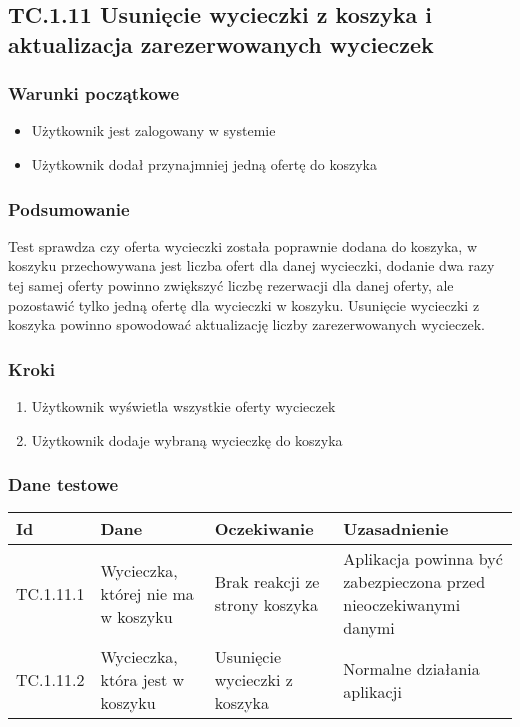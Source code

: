 \documentclass[a4paper,15pt]{article}
\begin{document}
\newpage
\begin{framed}
\subsection{TC.1.11 Usunięcie wycieczki z koszyka i aktualizacja zarezerwowanych wycieczek}


\vspace{0.5cm}

\subsubsection{Warunki początkowe}
\begin{itemize}
\item Użytkownik jest zalogowany w systemie
\item Użytkownik dodał przynajmniej jedną ofertę do koszyka
\end{itemize}

\subsubsection{Podsumowanie}
Test sprawdza czy oferta wycieczki została poprawnie dodana do koszyka, w koszyku przechowywana jest liczba ofert dla danej wycieczki, dodanie dwa razy tej samej oferty powinno zwiększyć liczbę rezerwacji dla danej oferty, ale pozostawić tylko jedną ofertę dla wycieczki w koszyku. Usunięcie wycieczki z koszyka powinno spowodować aktualizację liczby zarezerwowanych wycieczek.

\subsubsection{Kroki}
\begin{enumerate}
\item Użytkownik wyświetla wszystkie oferty wycieczek
\item Użytkownik dodaje wybraną wycieczkę do koszyka
\end{enumerate}

\subsubsection{Dane testowe}

\begin{center}
\begin{tabular}{ |C{1.5cm}|C{3cm}|C{4cm}|C{4cm}| } 
 \hline
 \textbf{Id} & \textbf{Dane} & \textbf{Oczekiwanie} & \textbf{Uzasadnienie} \\ \hline
 TC.1.11.1 & Wycieczka, której nie ma w koszyku & Brak reakcji ze strony koszyka & Aplikacja powinna być zabezpieczona przed nieoczekiwanymi danymi \\ \hline
 TC.1.11.2 & Wycieczka, która jest w koszyku & Usunięcie wycieczki z koszyka & Normalne działania aplikacji \\ \hline
\end{tabular}
\end{center}

\end{framed}
\end{document}
